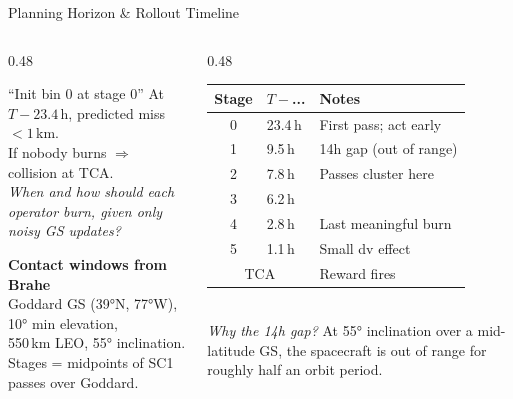 \documentclass[aspectratio=169]{beamer}
\begin{document}
\begin{frame}{Planning Horizon \& Rollout Timeline}
  \begin{columns}
    \begin{column}{0.48\textwidth}
      \begin{block}{``Init bin 0 at stage 0''}
        At $T{-}23.4$\,h, predicted miss $< 1$\,km.\\
        If nobody burns $\Rightarrow$ collision at TCA.\\[0.3em]
        \emph{When and how should each operator burn, given only noisy GS updates?}
      \end{block}
      \vspace{0.5em}
      \textbf{Contact windows from Brahe}\\
      \small Goddard GS (39°N, 77°W), 10° min elevation,\\
      550\,km LEO, 55° inclination.\\
      Stages = midpoints of SC1 passes over Goddard.
    \end{column}
    \begin{column}{0.48\textwidth}
      \begin{tabular}{cll}
        \toprule
        Stage & $T{-}$... & Notes \\
        \midrule
        0 & 23.4\,h & First pass; act early \\
        1 &  9.5\,h & 14h gap (out of range) \\
        2 &  7.8\,h & Passes cluster here \\
        3 &  6.2\,h & \\
        4 &  2.8\,h & Last meaningful burn \\
        5 &  1.1\,h & Small dv effect \\
        \multicolumn{2}{c}{TCA} & Reward fires \\
        \bottomrule
      \end{tabular}\\[0.3em]
      \small\textit{Why the 14h gap?} At 55° inclination over a mid-latitude GS, the spacecraft is out of range for roughly half an orbit period.
    \end{column}
  \end{columns}
\end{frame}
\end{document}
